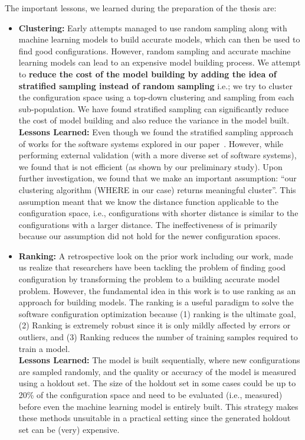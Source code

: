 The important lessons, we learned during the preparation of the thesis are:
\begin{itemize}
    \item \textbf{Clustering: } Early attempts managed to use random sampling along with machine learning models to build accurate models, which can then be used to find good configurations. However, random sampling and accurate machine learning models can lead to an expensive model building process. We attempt to \textbf{reduce the cost of the model building by adding the idea of stratified sampling instead of random sampling} i.e.; we try to cluster the configuration space using a top-down clustering and sampling from each sub-population. We have found stratified sampling can significantly reduce the cost of model building and also reduce the variance in the model built. \\
    \noindent\textbf{Lessons Learned: } Even though we found the stratified sampling approach of \what works for the software systems explored in our paper~\cite{nair2017faster}. However, while performing external validation (with a more diverse set of software systems), we found that \what is not efficient (as shown by our preliminary study). Upon further investigation, we found that we make an important assumption: ``our clustering algorithm (WHERE in our case) returns meaningful cluster''. This assumption meant that we know the distance function applicable to the configuration space, i.e., configurations with shorter distance is similar to the configurations with a larger distance. The ineffectiveness of \what is primarily because our assumption did not hold for the newer configuration spaces.
    
    \item \textbf{Ranking: } A retrospective look on the prior work including our work, made us realize that researchers have been tackling the problem of finding good configuration by transforming the problem to a building accurate model problem. However, the fundamental idea in this work is to use ranking as an approach for building models. The ranking is a useful paradigm to solve the software configuration optimization because (1) ranking is the ultimate goal, (2) Ranking is extremely robust since it is only mildly affected by errors or outliers, and (3) Ranking reduces the number of training samples required to train a model.\\
    \noindent\textbf{Lessons Learned:} The model is built sequentially, where new configurations are sampled randomly, and the quality or accuracy of the model is measured using a holdout set. The size of the holdout set in some cases could be up to 20\% of the configuration space and need to be evaluated (i.e., measured) before even the machine learning model is entirely built. This strategy makes these methods unsuitable in a practical setting since the generated holdout set can be (very) expensive. 
    

\end{itemize}
